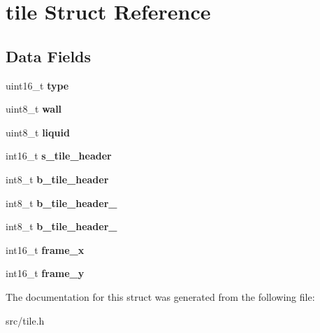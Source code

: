 \hypertarget{structtile}{}\section{tile Struct Reference}
\label{structtile}
\subsection*{Data Fields}
\begin{DoxyCompactItemize}
\item 
\hypertarget{structtile_a9ed34719a052d3e7b7de0a828553481d}{}uint16\+\_\+t {\bfseries type}\label{structtile_a9ed34719a052d3e7b7de0a828553481d}

\item 
\hypertarget{structtile_a9ff9478797bb771756501465ff242c96}{}uint8\+\_\+t {\bfseries wall}\label{structtile_a9ff9478797bb771756501465ff242c96}

\item 
\hypertarget{structtile_adebfaa93d069ed51cd6083aadce41332}{}uint8\+\_\+t {\bfseries liquid}\label{structtile_adebfaa93d069ed51cd6083aadce41332}

\item 
\hypertarget{structtile_a2cf79dbf7e2a6012013d8d8715f1df48}{}int16\+\_\+t {\bfseries s\+\_\+tile\+\_\+header}\label{structtile_a2cf79dbf7e2a6012013d8d8715f1df48}

\item 
\hypertarget{structtile_ac924f0fae6c3315dc790afaf5aa56e27}{}int8\+\_\+t {\bfseries b\+\_\+tile\+\_\+header}\label{structtile_ac924f0fae6c3315dc790afaf5aa56e27}

\item 
\hypertarget{structtile_a152a52cfc9ea7985294ace528e9e8adf}{}int8\+\_\+t {\bfseries b\+\_\+tile\+\_\+header\+\_}\label{structtile_a152a52cfc9ea7985294ace528e9e8adf}

\item 
\hypertarget{structtile_a2d3d6d8b23395e1f36b8911efe6f9828}{}int8\+\_\+t {\bfseries b\+\_\+tile\+\_\+header\+\_}\label{structtile_a2d3d6d8b23395e1f36b8911efe6f9828}

\item 
\hypertarget{structtile_ab1888fd52dcc3d2aa5080f4961bc730a}{}int16\+\_\+t {\bfseries frame\+\_\+x}\label{structtile_ab1888fd52dcc3d2aa5080f4961bc730a}

\item 
\hypertarget{structtile_a8e80cf83c999c5cd00b42721fc1e0c7c}{}int16\+\_\+t {\bfseries frame\+\_\+y}\label{structtile_a8e80cf83c999c5cd00b42721fc1e0c7c}

\end{DoxyCompactItemize}


The documentation for this struct was generated from the following file\+:\begin{DoxyCompactItemize}
\item 
src/tile.\+h\end{DoxyCompactItemize}
